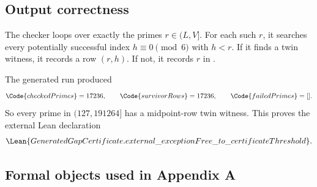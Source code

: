 \subsection{Output correctness}

The checker loops over exactly the primes \(r\in(L,V]\).  For each such \(r\),
it searches every potentially successful index \(h\equiv 0\pmod 6\) with
\(h<r\).  If it finds a twin witness, it records a row \((r,h)\).  If not, it
records \(r\) in .

The generated run produced
\[
  \Code{checkedPrimes}=17236,\qquad
  \Code{survivorRows}=17236,\qquad
  \Code{failedPrimes}=[].
\]
So every prime in \((127,191264]\) has a midpoint-row twin witness.
This proves the external Lean declaration
\[
  \Lean{GeneratedGapCertificate.external\_exceptionFree\_to\_certificateThreshold}.
\]

\subsection{Formal objects used in Appendix A}

